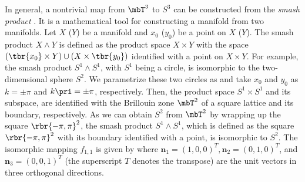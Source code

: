 \documentclass[
floatfix,
pra,
twocolumn,
reprint,
amsmath,amssymb,
aps,
footnote,
]{revtex4}
\begin{document}
In general, a nontrivial map from $\mbT^3$ to $S^3$ can be constructed from the \textit{smash product} \cite{Nakahara03}.
It is a mathematical tool for constructing a manifold from two manifolds.
Let $X$ ($Y$) be a manifold and $x_0$ ($y_0$) be a point on $X$ ($Y$).
The smash product $X \wedge Y$ is defined as the product space $X \times Y$ with the space $(\tbr{x_0} \times Y) \cup (X \times \tbr{y_0} )$ identified with a point on $X \times Y$.
For example, the smash product $S^1 \wedge S^1$, with $S^1$ being a circle, is isomorphic to the two-dimensional sphere $S^2$.
We parametrize these two circles as
and take $x_0$ and $y_0$ as $k = \pm\pi$ and $k\pri = \pm\pi$, respectively.
Then, the product space $S^1 \times S^1$ and its subspace,
are identified with the Brillouin zone $\mbT^2$ of a square lattice and its boundary, respectively.
As we can obtain $S^2$ from $\mbT^2$ by wrapping up the square $\rbr{-\pi, \pi}^2$,
the smash product $S^1 \wedge S^1$, which is defined as the square $\rbr{-\pi, \pi}^2$ with its boundary identified with a point, is isomorphic to $S^2$.
The isomorphic mapping $f_{1,1}$ is given by
where $\bm{n}_1 = (1,0,0)^T, \bm{n}_2 = (0,1,0)^T$, and $\bm{n}_3 = (0,0,1)^T$ (the superscript $T$ denotes the transpose) are the unit vectors in three orthogonal directions.
\end{document}
